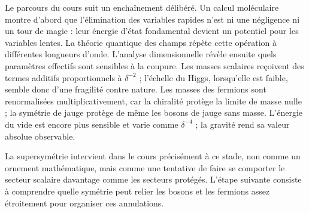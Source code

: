 Le parcours du cours suit un enchaînement délibéré. Un calcul moléculaire montre d’abord que l’élimination des variables rapides n’est ni une négligence ni un tour de magie : leur énergie d’état fondamental devient un potentiel pour les variables lentes. La théorie quantique des champs répète cette opération à différentes longueurs d’onde. L’analyse dimensionnelle révèle ensuite quels paramètres effectifs sont sensibles à la coupure. Les masses scalaires reçoivent des termes additifs proportionnels à \(\delta^{-2}\) ; l’échelle du Higgs, lorsqu’elle est faible, semble donc d’une fragilité contre nature. Les masses des fermions sont renormalisées multiplicativement, car la chiralité protège la limite de masse nulle ; la symétrie de jauge protège de même les bosons de jauge sans masse. L’énergie du vide est encore plus sensible et varie comme \(\delta^{-4}\) ; la gravité rend sa valeur absolue observable.

La supersymétrie intervient dans le cours précisément à ce stade, non comme un ornement mathématique, mais comme une tentative de faire se comporter le secteur scalaire davantage comme les secteurs protégés. L’étape suivante consiste à comprendre quelle symétrie peut relier les bosons et les fermions assez étroitement pour organiser ces annulations.
